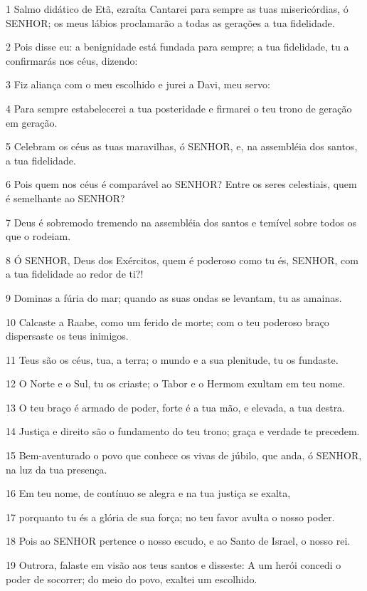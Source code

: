 \par 1 Salmo didático de Etã, ezraíta Cantarei para sempre as tuas misericórdias, ó SENHOR; os meus lábios proclamarão a todas as gerações a tua fidelidade.
\par 2 Pois disse eu: a benignidade está fundada para sempre; a tua fidelidade, tu a confirmarás nos céus, dizendo:
\par 3 Fiz aliança com o meu escolhido e jurei a Davi, meu servo:
\par 4 Para sempre estabelecerei a tua posteridade e firmarei o teu trono de geração em geração.
\par 5 Celebram os céus as tuas maravilhas, ó SENHOR, e, na assembléia dos santos, a tua fidelidade.
\par 6 Pois quem nos céus é comparável ao SENHOR? Entre os seres celestiais, quem é semelhante ao SENHOR?
\par 7 Deus é sobremodo tremendo na assembléia dos santos e temível sobre todos os que o rodeiam.
\par 8 Ó SENHOR, Deus dos Exércitos, quem é poderoso como tu és, SENHOR, com a tua fidelidade ao redor de ti?!
\par 9 Dominas a fúria do mar; quando as suas ondas se levantam, tu as amainas.
\par 10 Calcaste a Raabe, como um ferido de morte; com o teu poderoso braço dispersaste os teus inimigos.
\par 11 Teus são os céus, tua, a terra; o mundo e a sua plenitude, tu os fundaste.
\par 12 O Norte e o Sul, tu os criaste; o Tabor e o Hermom exultam em teu nome.
\par 13 O teu braço é armado de poder, forte é a tua mão, e elevada, a tua destra.
\par 14 Justiça e direito são o fundamento do teu trono; graça e verdade te precedem.
\par 15 Bem-aventurado o povo que conhece os vivas de júbilo, que anda, ó SENHOR, na luz da tua presença.
\par 16 Em teu nome, de contínuo se alegra e na tua justiça se exalta,
\par 17 porquanto tu és a glória de sua força; no teu favor avulta o nosso poder.
\par 18 Pois ao SENHOR pertence o nosso escudo, e ao Santo de Israel, o nosso rei.
\par 19 Outrora, falaste em visão aos teus santos e disseste: A um herói concedi o poder de socorrer; do meio do povo, exaltei um escolhido.
